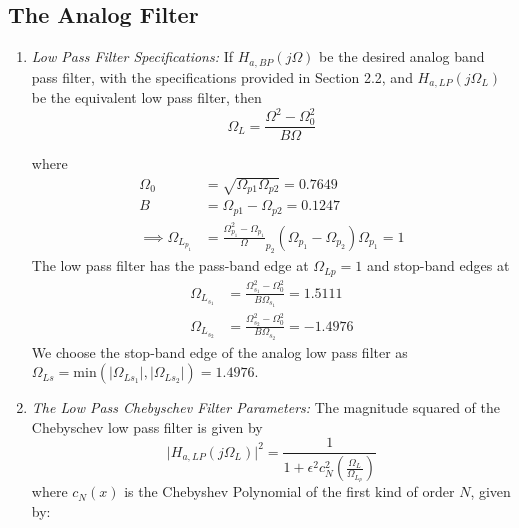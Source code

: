 \documentclass{article}
\begin{document}
\subsection{The Analog Filter}
\begin{enumerate}

\item {\em Low Pass Filter Specifications:}  If $H_{a, BP}(j\Omega)$ be the desired analog band
pass filter,  with the specifications provided in Section 2.2, and $H_{a,LP}(j\Omega_L)$ 
be the equivalent low pass filter, then
\begin{equation}
\label{transition}
\Omega_L = \frac{\Omega^2 - \Omega_0^2}{B\Omega}
\end{equation}

where 
\begin{align*}
\Omega_0 &= \sqrt{\Omega_{p1}\Omega_{p2}} = 0.7649\\
B &= \Omega_{p1} - \Omega_{p2} = 0.1247\\
	\implies \Omega_{L_{p_1}} &= \frac{\Omega_{p_1}^2 - \Omega_{p_1}}\Omega_{p_2}{(\Omega_{p_1} - \Omega_{p_2})\Omega_{p_1}} = 1
\end{align*}
The low pass filter has
the pass-band edge at $\Omega_{Lp} = 1$ and stop-band edges at 
\begin{align*}
    \Omega_{L_{s_1}} &= \frac{\Omega_{s_1}^2 - \Omega_0^2}{B\Omega_{s_1}} =  1.5111\\
    \Omega_{L_{s_2}} &= \frac{\Omega_{s_2}^2 - \Omega_0^2}{B\Omega_{s_2}} = -1.4976
\end{align*}
We choose the stop-band edge of the analog low pass filter as $\Omega_{Ls} = \mbox{min}(\vert \Omega_{Ls_1}\vert,\vert \Omega_{Ls_2}\vert) = 1.4976$.

\item {\em The Low Pass Chebyschev Filter Parameters:}  The magnitude squared of the Chebyschev low pass filter is given by 
\begin{equation}
\label{lpfirst}
\vert H_{a,LP}(j\Omega_L)\vert^2 = \frac{1}{1 + \epsilon^2c_N^2\left(\frac{\Omega_L}{\Omega_{L_p}}\right)}
\end{equation}
where $c_N(x)$ is the Chebyshev Polynomial of the first kind of order $N$, given by:


\end{enumerate}
\end{document}
